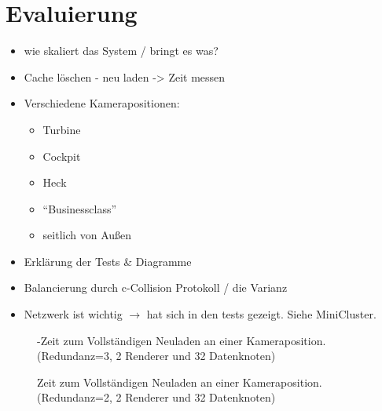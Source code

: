 \chapter{Evaluierung}
\label{chap:eval}
%
\begin{itemize}
 \item wie skaliert das System / bringt es was?
 \item Cache löschen - neu laden -> Zeit messen
 \item Verschiedene Kamerapositionen:
 \begin{itemize}
  \item Turbine
  \item Cockpit
  \item Heck
  \item ``Businessclass''
  \item seitlich von Außen
 \end{itemize}
 \item Erklärung der Tests \& Diagramme
 \item Balancierung durch c-Collision Protokoll / die Varianz
 \item Netzwerk ist wichtig $\rightarrow$ hat sich in den tests gezeigt. Siehe MiniCluster.
\end{itemize}
%
%


\begin{figure}
\centering

  \caption{\label{fig:eval:reaload1}-Zeit zum Vollständigen Neuladen an einer Kameraposition. (Redundanz=3, 2 Renderer und 32 Datenknoten)}
\end{figure}

\begin{figure}
\centering

  \caption{\label{fig:eval:reload2}Zeit zum Vollständigen Neuladen an einer Kameraposition. (Redundanz=2, 2 Renderer und 32 Datenknoten)}
\end{figure}
%

